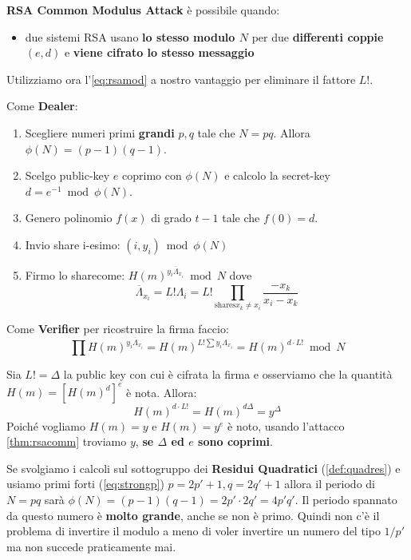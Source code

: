 \begin{remark}\textbf{RSA Common Modulus Attack} è possibile quando:
\begin{itemize}
    \item due sistemi RSA usano \textbf{lo stesso modulo $N$} per due \textbf{differenti coppie} $(e,d)$ e \textbf{viene cifrato lo stesso messaggio}
\end{itemize}
\end{remark}
Utilizziamo ora l'\cref{eq:rsamod} a nostro vantaggio per eliminare il fattore $L!$.
\begin{definition}\label{def:shouprsa}
Come \textbf{Dealer}:
\begin{enumerate}
    \item Scegliere numeri primi \textbf{grandi} $p,q$ tale che $N=pq$. Allora $\phi(N)=(p-1)(q-1)$.
    \item Scelgo public-key $e$ coprimo con $\phi(N)$ e calcolo la secret-key $d=e^{-1}\bmod\phi(N)$.
    \item Genero polinomio $f(x)$ di grado $t-1$ tale che $f(0)=d$.
    \item Invio share i-esimo: $(i,y_i)\bmod\phi(N)$
    \item Firmo lo share\footnotemark come: $H(m)^{y_i\overline{\Lambda}_{x_i}}\bmod N$ dove
    \[\overline{\Lambda}_{x_i}=L!\Lambda_i=L!\prod_{\text{shares} x_k\ne x_i}\frac{-x_k}{x_i-x_k}\]
\end{enumerate}
Come \textbf{Verifier} per ricostruire la firma faccio:
\[\prod H(m)^{y_i\overline{\Lambda}_{x_i}}=H(m)^{L!\sum y_i\Lambda_{x_i}}=H(m)^{d\cdot L!}\bmod{N}\]
\begin{remark}
Sia $L!=\Delta$ la public key con cui è cifrata la firma e osserviamo che la quantità $H(m)=[H(m)^{d}]^e$ è nota\footnotemark.
Allora:
\[H(m)^{d\cdot L!}=H(m)^{d\Delta}=y^{\Delta}\]
Poiché vogliamo $H(m)=y$ e $H(m)=y^e$ è noto, usando l'attacco \cref{thm:rsacomm} troviamo $y$, \textbf{se $\Delta$ ed $e$ sono coprimi\footnotemark}.
\end{remark}
\end{definition}
\begin{remark}Se svolgiamo i calcoli sul sottogruppo dei \textbf{Residui Quadratici} (\cref{def:quadres}) e usiamo primi forti (\cref{eq:strongp}) $p=2p'+1,q=2q'+1$ allora il periodo di $N=pq$ sarà $\phi(N)=(p-1)(q-1)=2p'\cdot2q'=4p'q'$. Il periodo spannato da questo numero è \textbf{molto grande}, anche se non è primo. Quindi non c'è il problema di invertire il modulo a meno di voler invertire un numero del tipo $1/p'$ ma non succede praticamente mai.
\end{remark}
